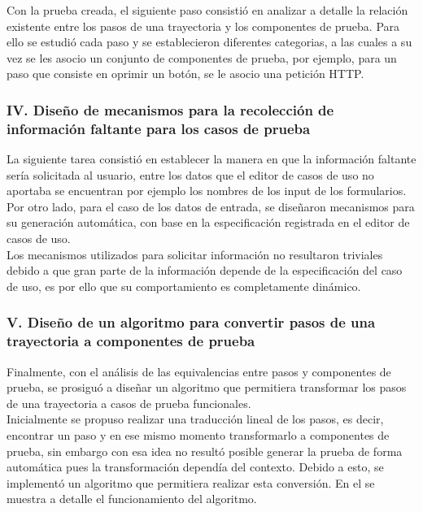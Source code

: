 	Con la prueba creada, el siguiente paso consistió en analizar a detalle la relación existente entre los pasos de una trayectoria y los componentes de prueba. Para ello se estudió cada paso y se establecieron diferentes categorias, a las cuales a su vez se les asocio un conjunto de componentes de prueba, por ejemplo, para un paso que consiste en oprimir un botón, se le asocio una petición HTTP.
	
	
	\subsubsection{IV. Diseño de mecanismos para la recolección de información faltante para los casos de prueba}

	La siguiente tarea consistió en establecer la manera en que la información faltante sería solicitada al usuario, entre los datos que el editor de casos de uso no aportaba se encuentran por ejemplo los nombres de los input de los formularios. Por otro lado, para el caso de los datos de entrada, se diseñaron mecanismos para su generación automática, con base en la especificación registrada en el editor de casos de uso.\\
	 Los mecanismos utilizados para solicitar información no resultaron triviales debido a que gran parte de la información depende de la especificación del caso de uso, es por ello que su comportamiento es completamente dinámico.
	

	\subsubsection{V. Diseño de un algoritmo para convertir pasos de una trayectoria a componentes de prueba}
	
	Finalmente, con el análisis de las equivalencias entre pasos y componentes de prueba, se prosiguó a diseñar un algoritmo que permitiera transformar los pasos de una trayectoria a casos de prueba funcionales.\\
	Inicialmente se propuso realizar una traducción lineal de los pasos, es decir, encontrar un paso y en ese mismo momento transformarlo a componentes de prueba, sin embargo con esa idea no resultó posible generar la prueba de forma automática pues la transformación dependía del contexto. Debido a esto, se implementó un algoritmo que permitiera realizar esta conversión. En el  se muestra a detalle el funcionamiento del algoritmo. 
	